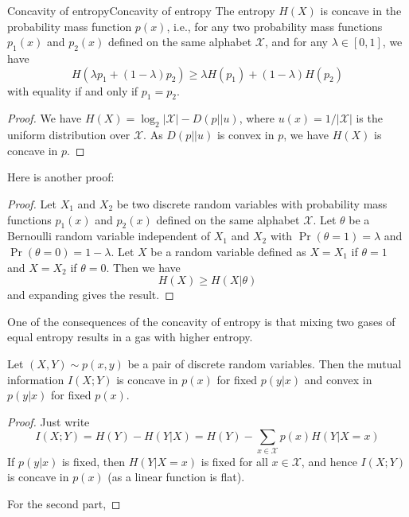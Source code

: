 \documentclass[../main.tex]{subfiles}
\begin{document}
\begin{theorem}{Concavity of entropy}{Concavity of entropy}
  The entropy $H(X)$ is concave in the probability mass function $p(x)$, i.e., for any two probability mass functions $p_1(x)$ and $p_2(x)$ defined on the same alphabet $\mathcal{X}$, and for any $\lambda \in [0,1]$, we have
  \begin{equation}
    H(\lambda p_1 + (1-\lambda) p_2) \geq \lambda H(p_1) + (1-\lambda) H(p_2)
  \end{equation}
  with equality if and only if $p_1 = p_2$.
\end{theorem}
\begin{proof}
  We have $H(X) = \log_2 |\mathcal{X}| - D(p||u)$, where $u(x) = 1/|\mathcal{X}|$ is the uniform distribution over $\mathcal{X}$. As $D(p||u)$ is convex in $p$, we have $H(X)$ is concave in $p$.
\end{proof}
Here is another proof:
\begin{proof}
  Let $X_1$ and $X_2$ be two discrete random variables with probability mass functions $p_1(x)$ and $p_2(x)$ defined on the same alphabet $\mathcal{X}$. Let $\theta$ be a Bernoulli random variable independent of $X_1$ and $X_2$ with $\Pr(\theta=1) = \lambda$ and $\Pr(\theta=0) = 1-\lambda$. Let $X$ be a random variable defined as $X = X_1$ if $\theta=1$ and $X = X_2$ if $\theta=0$. Then we have
  \begin{equation*}
    H(X) \geq H(X|\theta)
  \end{equation*}
  and expanding gives the result.
\end{proof}

\begin{remark}
  One of the consequences of the concavity of entropy is that mixing two gases of equal entropy results in a gas with higher entropy.
\end{remark}

\begin{theorem}{}{}
  Let $(X, Y) \sim p(x,y)$ be a pair of discrete random variables. Then the mutual information $I(X;Y)$ is concave in $p(x)$ for fixed $p(y|x)$ and convex in $p(y|x)$ for fixed $p(x)$.
\end{theorem}
\begin{proof}
  Just write
  \begin{equation*}
    I(X;Y) = H(Y) - H(Y|X) = H(Y) - \sum_{x \in \mathcal{X}} p(x) H(Y|X=x)
  \end{equation*}
  If $p(y|x)$ is fixed, then $H(Y|X=x)$ is fixed for all $x \in \mathcal{X}$, and hence $I(X;Y)$ is concave in $p(x)$ (as a linear function is flat).

  For the second part, 
\end{proof}
\end{document}
